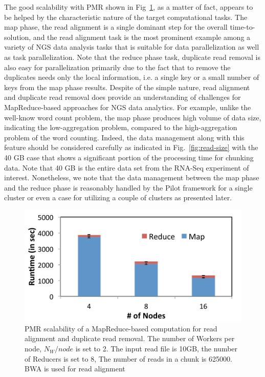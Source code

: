 \documentclass{acm_proc_article-sp}
\begin{document}
The good scalability with PMR shown in Fig~\ref{fig:scale-p-saga-mr}, as a matter of fact, appears to be helped by the characteristic nature of the target computational tasks.  The map phase, the read alignment is a single dominant step for the overall time-to-solution, and the read alignment task is the most prominent example among a variety of NGS data analysis tasks that is suitable for data parallelization as well as task parallelization.  Note that the reduce phase task, duplicate read removal is also easy for parallelization primarily due to the fact that to remove the duplicates needs only the local information, i.e. a single key or a small number of keys from the map phase results.  Despite of the simple nature, read alignment and duplicate read removal does provide an understanding of challenges for MapReduce-based approaches for NGS data analytics.  For example, unlike the well-know word count problem, the map phase produces high volume of data size, indicating the low-aggregation problem, compared to the high-aggregation problem of the word counting\cite{weissman-mr-11}.  Indeed, the data management along with this feature should be considered carefully as indicated in Fig.~\ref{fig:read-size} with the 40 GB case that shows a significant portion of the processing time for chunking data.  Note that 40 GB is the entire data set from the RNA-Seq experiment of interest.  Nonetheless, we note that the data management between the map phase and the reduce phase is reasonably handled by the Pilot framework for a single cluster or even a case for utilizing a couple of clusters as presented later.


\begin{figure}
 \centering
\includegraphics[scale=0.50]{figures/pj-smr-scale.pdf}
\caption{\small PMR scalability of a MapReduce-based computation for read alignment and duplicate read removal.  The number of Workers per node, $N_{W}/node$ is set to 2.   The input read file is 10GB, the number of Reducers is set to 8, The number of reads in a chunk is 625000. BWA is used for read alignment}
  \label{fig:scale-p-saga-mr} 
\end{figure}
\end{document}
